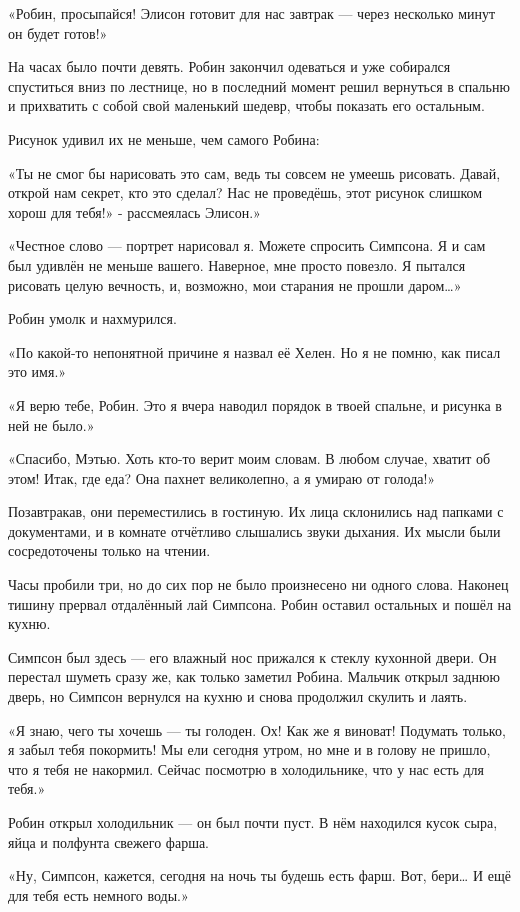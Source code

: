 \documentclass[a5paper, 9pt,
final, openany, twoside=true]{memoir}
\begin{document}
«Робин, просыпайся! Элисон готовит для нас завтрак — через несколько минут он будет готов!»

На часах было почти девять. Робин закончил одеваться и уже собирался спуститься вниз по лестнице, но в последний момент решил вернуться в спальню и прихватить с собой свой маленький шедевр, чтобы показать его остальным.

Рисунок удивил их не меньше, чем самого Робина:

«Ты не смог бы нарисовать это сам, ведь ты совсем не умеешь рисовать. Давай, открой нам секрет, кто это сделал? Нас не проведёшь, этот рисунок слишком хорош для тебя!» - рассмеялась Элисон.»

«Честное слово — портрет нарисовал я. Можете спросить Симпсона. Я и сам был удивлён не меньше вашего. Наверное, мне просто повезло. Я пытался рисовать целую вечность, и, возможно, мои старания не прошли даром…»

Робин умолк и нахмурился.

«По какой-то непонятной причине я назвал её Хелен. Но я не помню, как писал это имя.»

«Я верю тебе, Робин. Это я вчера наводил порядок в твоей спальне, и рисунка в ней не было.»

«Спасибо, Мэтью. Хоть кто-то верит моим словам. В любом случае, хватит об этом! Итак, где еда? Она пахнет великолепно, а я умираю от голода!»\bigskip

Позавтракав, они переместились в гостиную. Их лица склонились над папками с документами, и в комнате отчётливо слышались звуки дыхания. Их мысли были сосредоточены только на чтении.

Часы пробили три, но до сих пор не было произнесено ни одного слова. Наконец тишину прервал отдалённый лай Симпсона. Робин оставил остальных и пошёл на кухню.

Симпсон был здесь — его влажный нос прижался к стеклу кухонной двери. Он перестал шуметь сразу же, как только заметил Робина. Мальчик открыл заднюю дверь, но Симпсон вернулся на кухню и снова продолжил скулить и лаять.

«Я знаю, чего ты хочешь — ты голоден. Ох! Как же я виноват! Подумать только, я забыл тебя покормить! Мы ели сегодня утром, но мне и в голову не пришло, что я тебя не накормил. Сейчас посмотрю в холодильнике, что у нас есть для тебя.»

Робин открыл холодильник — он был почти пуст. В нём находился кусок сыра, яйца и полфунта свежего фарша.

«Ну, Симпсон, кажется, сегодня на ночь ты будешь есть фарш. Вот, бери… И ещё для тебя есть немного воды.»
\end{document}
